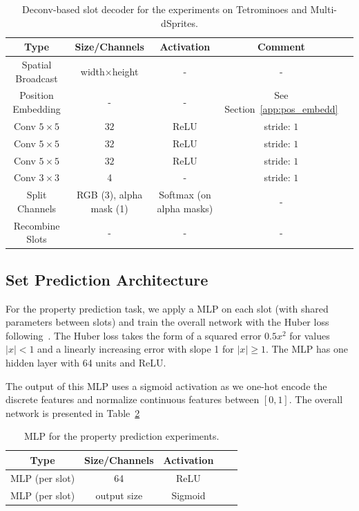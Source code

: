 \documentclass{article}
\begin{document}
\begin{table}[htp!]
\centering
\caption{Deconv-based slot decoder for the experiments on Tetrominoes and Multi-dSprites.}
\begin{tabular}{ccccc}
\toprule
Type & Size/Channels & Activation & Comment \\
\midrule
Spatial Broadcast & width$\times$height & - &  - \\
Position Embedding & - & - &  See Section~\ref{app:pos_embedd} \\
Conv $5\times 5$ & $32$ & ReLU & stride: $1$\\
Conv $5\times 5$ & $32$ & ReLU & stride: $1$\\
Conv $5\times 5$ & $32$ & ReLU & stride: $1$\\
Conv $3\times 3$ & 4 & - & stride: $1$\\
Split Channels & RGB (3), alpha mask (1) & Softmax (on alpha masks) & - \\
Recombine Slots & - & - & - \\
\bottomrule
\end{tabular}
\label{table:architecture_cnn_dec_tetr}
\end{table}


\subsection{Set Prediction Architecture}
\label{sec:app_set_pred_arch}
For the property prediction task, we apply a MLP on each slot (with shared parameters between slots) and train the overall network with the Huber loss following~\cite{zhang2019deep}. The Huber loss takes the form of a squared error $0.5x^2$ for values $|x|<1$ and a linearly increasing error with slope 1 for $|x|\geq1$. The MLP has one hidden layer with 64 units and ReLU.

The output of this MLP uses a sigmoid activation as we one-hot encode the discrete features and normalize continuous features between $[0, 1]$. The overall network is presented in Table~\ref{table:architecture_mlp_pp}
\begin{table}[htp!]
\centering
\caption{MLP for the property prediction experiments.}
\begin{tabular}{ccccc}
\toprule
Type & Size/Channels & Activation  \\
\midrule
MLP (per slot) & 64 & ReLU  \\
MLP (per slot) & output size & Sigmoid   \\
\bottomrule
\end{tabular}
\label{table:architecture_mlp_pp}
\end{table}
\end{document}
